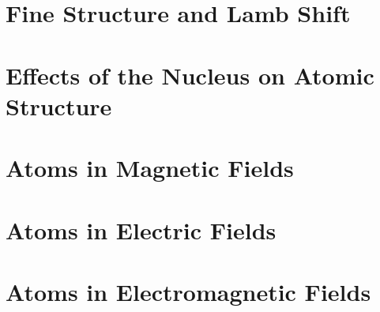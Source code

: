 \documentclass{book}
\theoremstyle{definition}
\begin{document}
\chapter{Fine Structure and Lamb Shift}
















\chapter{Effects of the Nucleus on Atomic Structure}














\chapter{Atoms in Magnetic Fields}












\chapter{Atoms in Electric Fields}










\chapter{Atoms in Electromagnetic Fields}
\end{document}
